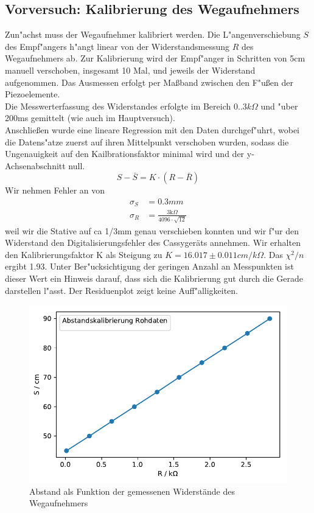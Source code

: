\documentclass[12pt,a4paper]{article}
\begin{document}
\subsection{Vorversuch: Kalibrierung des Wegaufnehmers}
Zun"achst muss der Wegaufnehmer kalibriert werden. Die L"angenverschiebung $S$ des Empf"angers h"angt linear von der Widerstandsmessung $R$ des Wegaufnehmers ab. Zur Kalibrierung wird der Empf"anger in Schritten von 5cm manuell verschoben, insgesamt 10 Mal, und jeweils der Widerstand aufgenommen. Das Ausmessen erfolgt per Ma\ss band zwischen den F"u\ss en der Piezoelemente.\\
Die Messwerterfassung des Widerstandes erfolgte im Bereich $0..3k\Omega$ und "uber 200ms gemittelt (wie auch im Hauptversuch).\\
Anschlie\ss en wurde eine lineare Regression mit den Daten durchgef"uhrt, wobei die Datens"atze zuerst auf ihren Mittelpunkt verschoben wurden, sodass die Ungenauigkeit auf den Kailbrationsfaktor minimal wird und der y-Achsenabschnitt null.
\begin{equation}
S-\bar{S}=K\cdot(R-\bar{R})
\end{equation}
Wir nehmen Fehler an von 
\begin{align}
\sigma_S &=0.3mm\\
\sigma_R &= \frac{3\text{k}\Omega}{4096\cdot\sqrt{12}}
\end{align}
weil wir die Stative auf ca 1/3mm genau verschieben konnten und wir f"ur den Widerstand den Digitalisierungsfehler des Cassygeräts annehmen.
Wir erhalten den Kalibrierungsfaktor K als Steigung zu $K=16.017\pm0.011cm/k\Omega$. Das $\chi^2/n$ ergibt 1.93. Unter Ber"ucksichtigung der geringen Anzahl an Messpunkten ist dieser Wert ein Hinweis darauf, dass sich die Kalibrierung gut durch die Gerade darstellen l"asst. Der Residuenplot zeigt keine Auff"alligkeiten.
\begin{figure}[H]
	\centering
	\includegraphics[scale=0.7]{Python/WegaufKal_Rohdaten.pdf}
	\caption{Abstand als Funktion der gemessenen Widerstände des Wegaufnehmers}
	\label{Abstandskal_Rohdaten}
\end{figure}
\end{document}
